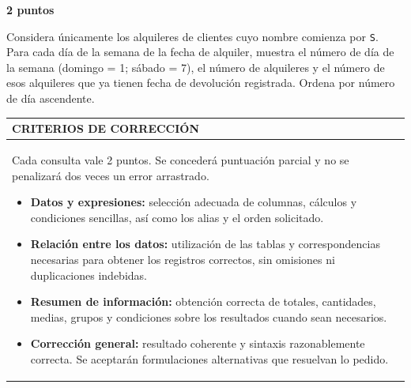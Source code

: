 \documentclass[11pt,a4paper]{article}
\begin{document}
\par\medskip{}\hfill{\color{LBcereza}\bfseries 2 puntos}\par\smallskip
Considera únicamente los alquileres de clientes cuyo nombre comienza por \texttt{S}. Para cada día de la semana de la fecha de alquiler, muestra el número de día de la semana (domingo = 1; sábado = 7), el número de alquileres y el número de esos alquileres que ya tienen fecha de devolución registrada. Ordena por número de día ascendente.\par\medskip
\medskip\noindent\begin{tabularx}{\textwidth}{|X|}\hline
\cellcolor{LBgris}\color{LBcian}\bfseries CRITERIOS DE CORRECCIÓN \\ \hline
\begin{minipage}{\dimexpr\linewidth-2\tabcolsep\relax}\vspace{2mm}\small Cada consulta vale 2 puntos. Se concederá puntuación parcial y no se penalizará dos veces un error arrastrado.\par\smallskip \begin{itemize}[leftmargin=4mm,nosep]\item \textbf{Datos y expresiones:} selección adecuada de columnas, cálculos y condiciones sencillas, así como los alias y el orden solicitado.
\item \textbf{Relación entre los datos:} utilización de las tablas y correspondencias necesarias para obtener los registros correctos, sin omisiones ni duplicaciones indebidas.
\item \textbf{Resumen de información:} obtención correcta de totales, cantidades, medias, grupos y condiciones sobre los resultados cuando sean necesarios.
\item \textbf{Corrección general:} resultado coherente y sintaxis razonablemente correcta. Se aceptarán formulaciones alternativas que resuelvan lo pedido.
\end{itemize}\vspace{2mm}\end{minipage} \\ \hline
\end{tabularx}\medskip
\end{document}
